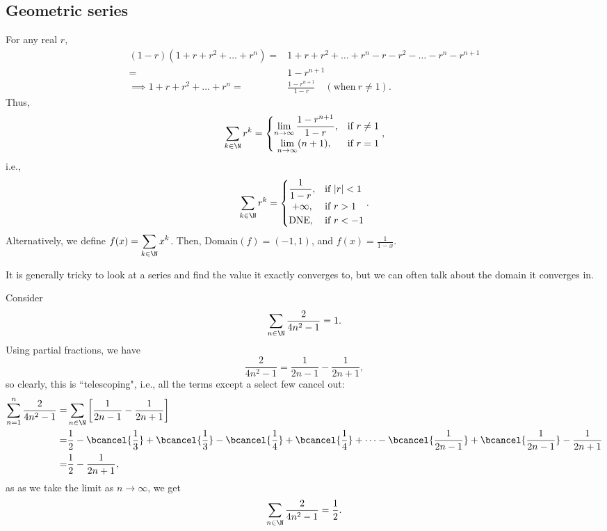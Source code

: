 \subsection{Geometric series}
For any real \(r\), 
\begin{align*}
	(1-r)(1+r+r^2+\dots+r^n)=&1+r+r^2+\dots+r^n-r-r^2-\dots-r^n-r^{n+1}\\
	=&1-r^{n+1}\\
	\implies 1+r+r^2+\dots+r^n=&\frac{1-r^{n+1}}{1-r}\quad(\text{when}~r\neq 1).
\end{align*}
Thus, 
\begin{equation*}
	\sum_{k\in\N}r^k=\begin{cases}
						\displaystyle\lim_{n\to\infty}\frac{1-r^{n+1}}{1-r},&\text{if}~r\neq 1\\\
						\displaystyle\lim_{n\to\infty}(n+1),&\text{if}~r=1
					 \end{cases},
\end{equation*}
i.e., 
\begin{equation*}
	\sum_{k\in\N}r^k=\begin{cases}
		\displaystyle\frac{1}{1-r},&\text{if}~|r|<1\\\
		+\infty,&\text{if}~r>1\\
		\text{DNE},&\text{if}~r<-1
	\end{cases}.
\end{equation*}
Alternatively, we define \(f(x)=\displaystyle\sum_{k\in\N}x^k\). Then, Domain\((f)=(-1,1)\), and \(f(x)=\displaystyle\frac{1}{1-x}\).
\begin{note}
	It is generally tricky to look at a series and find the value it exactly converges to, but we can often talk about the domain it converges in.
\end{note}
\begin{example}
	Consider 
	\begin{equation*}
		\sum_{n\in\N}\frac{2}{4n^2-1}=1.
	\end{equation*}
	Using partial fractions, we have 
	\begin{equation*}
		\frac{2}{4n^2-1}=\frac{1}{2n-1}-\frac{1}{2n+1},
	\end{equation*}
	so clearly, this is ``telescoping", i.e., all the terms except a select few cancel out:
	\begin{align*}
		\sum_{n=1}^n\frac{2}{4n^2-1}=&\sum_{n\in\N}\left[\frac{1}{2n-1}-\frac{1}{2n+1}\right]\\
		=&\frac{1}{2}-\bcancel{\frac{1}{3}}+\bcancel{\frac{1}{3}}-\bcancel{\frac{1}{4}}+\bcancel{\frac{1}{4}}+\dots-\bcancel{\frac{1}{2n-1}}+\bcancel{\frac{1}{2n-1}}-\frac{1}{2n+1}\\
		=&\frac{1}{2}-\frac{1}{2n+1},
	\end{align*}
	as as we take the limit as \(n\to\infty\), we get 
	\begin{equation*}
		\sum_{n\in\N}\frac{2}{4n^2-1}=\frac{1}{2}.
	\end{equation*}
\end{example}